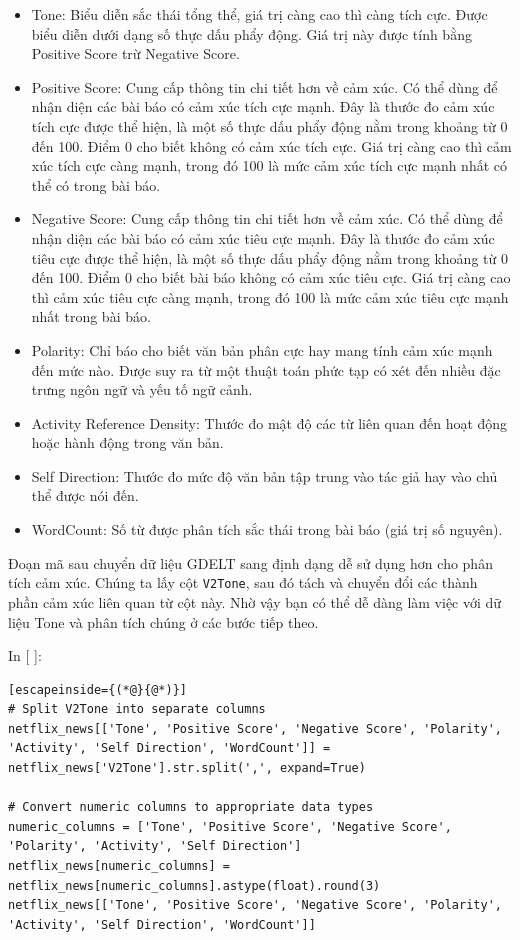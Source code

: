 \begin{itemize}
\item
  Tone: Biểu diễn sắc thái tổng thể, giá trị càng cao thì càng tích cực. Được biểu diễn dưới dạng số thực dấu phẩy động. Giá trị này được tính bằng Positive Score trừ Negative Score.
\item
  Positive Score: Cung cấp thông tin chi tiết hơn về cảm xúc. Có thể dùng để nhận diện các bài báo có cảm xúc tích cực mạnh. Đây là thước đo cảm xúc tích cực được thể hiện, là một số thực dấu phẩy động nằm trong khoảng từ 0 đến 100. Điểm 0 cho biết không có cảm xúc tích cực. Giá trị càng cao thì cảm xúc tích cực càng mạnh, trong đó 100 là mức cảm xúc tích cực mạnh nhất có thể có trong bài báo.
\item
  Negative Score: Cung cấp thông tin chi tiết hơn về cảm xúc. Có thể dùng để nhận diện các bài báo có cảm xúc tiêu cực mạnh. Đây là thước đo cảm xúc tiêu cực được thể hiện, là một số thực dấu phẩy động nằm trong khoảng từ 0 đến 100. Điểm 0 cho biết bài báo không có cảm xúc tiêu cực. Giá trị càng cao thì cảm xúc tiêu cực càng mạnh, trong đó 100 là mức cảm xúc tiêu cực mạnh nhất trong bài báo.
\item
  Polarity: Chỉ báo cho biết văn bản phân cực hay mang tính cảm xúc mạnh đến mức nào. Được suy ra từ một thuật toán phức tạp có xét đến nhiều đặc trưng ngôn ngữ và yếu tố ngữ cảnh.
\item
  Activity Reference Density: Thước đo mật độ các từ liên quan đến hoạt động hoặc hành động trong văn bản.
\item
  Self Direction: Thước đo mức độ văn bản tập trung vào tác giả hay vào chủ thể được nói đến.
\item
  WordCount: Số từ được phân tích sắc thái trong bài báo (giá trị số nguyên).
\end{itemize}

Đoạn mã sau chuyển dữ liệu GDELT sang định dạng dễ sử dụng hơn cho phân tích cảm xúc. Chúng ta lấy cột \texttt{V2Tone}, sau đó tách và chuyển đổi các thành phần cảm xúc liên quan từ cột này. Nhờ vậy bạn có thể dễ dàng làm việc với dữ liệu Tone và phân tích chúng ở các bước tiếp theo.

In {[} {]}:

\begin{lstlisting}[escapeinside={(*@}{@*)}]
# Split V2Tone into separate columns
netflix_news[['Tone', 'Positive Score', 'Negative Score', 'Polarity', 'Activity', 'Self Direction', 'WordCount']] = netflix_news['V2Tone'].str.split(',', expand=True)

# Convert numeric columns to appropriate data types
numeric_columns = ['Tone', 'Positive Score', 'Negative Score', 'Polarity', 'Activity', 'Self Direction']
netflix_news[numeric_columns] = netflix_news[numeric_columns].astype(float).round(3)
netflix_news[['Tone', 'Positive Score', 'Negative Score', 'Polarity', 'Activity', 'Self Direction', 'WordCount']]
\end{lstlisting}

